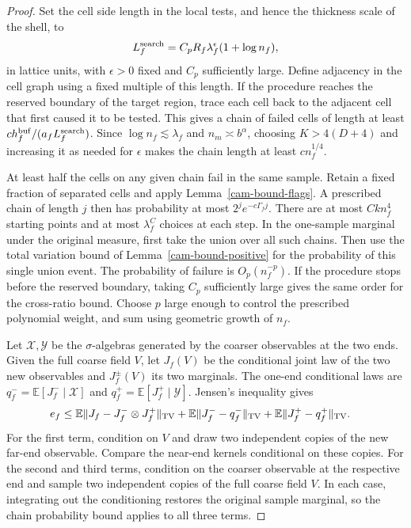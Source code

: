 \documentclass[11pt,a4paper]{article}
\numberwithin{equation}{section}
\begin{document}
\begin{proof}
Set the cell side length in the local tests, and hence the thickness scale of the shell, to
\[
 L_f^{\rm search}
  =C_p R_f\lambda_f^{\epsilon}(1+\log n_f),
\]
in lattice units, with \(\epsilon>0\) fixed and \(C_p\) sufficiently large. Define adjacency in the cell graph using a fixed multiple of this length. If the procedure reaches the reserved boundary of the target region, trace each cell back to the adjacent cell that first caused it to be tested. This gives a chain of failed cells of length at least \(c h_f^{\rm buf}/(a_f L_f^{\rm search})\). Since \(\log n_f\lesssim\lambda_f\) and \(n_m\asymp b^\alpha\), choosing \(K>4(D+4)\) and increasing it as needed for \(\epsilon\) makes the chain length at least \(c n_f^{1/4}\).

At least half the cells on any given chain fail in the same sample. Retain a fixed fraction of separated cells and apply Lemma~\ref{cam-bound-flags}. A prescribed chain of length \(j\) then has probability at most \(2^je^{-c\Gamma_f j}\). There are at most \(Ckn_f^4\) starting points and at most \(\lambda_f^C\) choices at each step. In the one-sample marginal under the original measure, first take the union over all such chains. Then use the total variation bound of Lemma~\ref{cam-bound-positive} for the probability of this single union event. The probability of failure is \(O_p(n_f^{-p})\). If the procedure stops before the reserved boundary, taking \(C_p\) sufficiently large gives the same order for the cross-ratio bound. Choose \(p\) large enough to control the prescribed polynomial weight, and sum using geometric growth of \(n_f\).

Let \(\mathcal X,\mathcal Y\) be the \(\sigma\)-algebras generated by the coarser observables at the two ends. Given the full coarse field \(V\), let \(J_f(V)\) be the conditional joint law of the two new observables and \(J_f^\pm(V)\) its two marginals. The one-end conditional laws are \(q_f^-=\mathbb E[J_f^-\mid\mathcal X]\) and \(q_f^+=\mathbb E[J_f^+\mid\mathcal Y]\). Jensen's inequality gives
\[
\begin{split}
 e_f\le{}&
  \mathbb E\|J_f-J_f^-\otimes J_f^+\|_{\rm TV}
  +\mathbb E\|J_f^--q_f^-\|_{\rm TV}
  +\mathbb E\|J_f^+-q_f^+\|_{\rm TV}.
\end{split}
\]
For the first term, condition on \(V\) and draw two independent copies of the new far-end observable. Compare the near-end kernels conditional on these copies. For the second and third terms, condition on the coarser observable at the respective end and sample two independent copies of the full coarse field \(V\). In each case, integrating out the conditioning restores the original sample marginal, so the chain probability bound applies to all three terms.


\end{proof}
\end{document}
